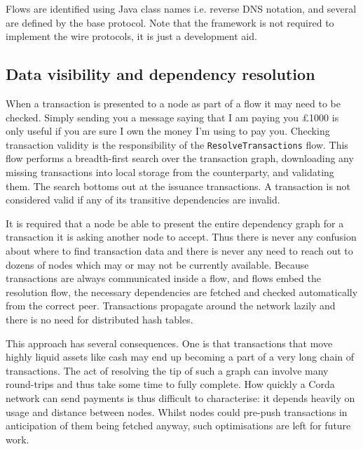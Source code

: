 \documentclass{article}
\begin{document}
Flows are identified using Java class names i.e. reverse DNS notation, and several are defined by the base
protocol. Note that the framework is not required to implement the wire protocols, it is just a development aid.


\subsection{Data visibility and dependency resolution}\label{subsec:data-visibility-and-dependency-resolution}

When a transaction is presented to a node as part of a flow it may need to be checked. Simply sending you a message
saying that I am paying you \pounds1000 is only useful if you are sure I own the money I'm using to pay you.
Checking transaction validity is the responsibility of the \texttt{ResolveTransactions} flow. This flow performs a
breadth-first search over the transaction graph, downloading any missing transactions into local storage from the
counterparty, and validating them. The search bottoms out at the issuance transactions. A transaction is not
considered valid if any of its transitive dependencies are invalid.

It is required that a node be able to present the entire dependency graph for a transaction it is asking another
node to accept. Thus there is never any confusion about where to find transaction data and there is never any need
to reach out to dozens of nodes which may or may not be currently available. Because transactions are always
communicated inside a flow, and flows embed the resolution flow, the necessary dependencies are fetched and checked
automatically from the correct peer. Transactions propagate around the network lazily and there is no need for
distributed hash tables.

This approach has several consequences. One is that transactions that move highly liquid assets like cash may end
up becoming a part of a very long chain of transactions. The act of resolving the tip of such a graph can involve
many round-trips and thus take some time to fully complete. How quickly a Corda network can send payments is thus
difficult to characterise: it depends heavily on usage and distance between nodes. Whilst nodes could pre-push
transactions in anticipation of them being fetched anyway, such optimisations are left for future work.
\end{document}
